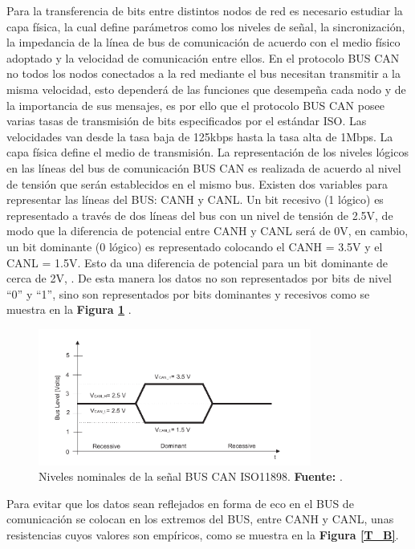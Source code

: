 Para la transferencia de bits entre distintos nodos de red es necesario estudiar la capa física, la cual define parámetros como los niveles de señal, la sincronización, la impedancia de la línea de bus de comunicación de acuerdo con el medio físico adoptado y la velocidad de comunicación entre ellos. En el protocolo BUS CAN no todos los nodos conectados a la red mediante el bus necesitan transmitir a la misma velocidad, esto dependerá de las funciones que desempeña cada nodo y de la importancia de sus mensajes, es por ello que el protocolo BUS CAN posee varias tasas de transmisión de bits especificados  por el estándar ISO. Las velocidades van desde la tasa baja de 125kbps hasta la tasa alta de 1Mbps.
La capa física define el medio de transmisión. La representación de los niveles lógicos en las líneas del bus de comunicación BUS CAN es realizada de acuerdo al nivel de tensión que serán establecidos en el mismo bus. Existen dos variables para representar las líneas del BUS: CANH y CANL. Un bit recesivo (1 lógico) es representado a través de dos líneas del bus con un nivel de tensión de 2.5V, de modo que la diferencia de potencial entre CANH  y CANL será de 0V, en cambio, un bit dominante (0 lógico) es representado colocando el CANH = 3.5V y el CANL = 1.5V. Esto da una diferencia de potencial para un bit dominante de cerca de 2V, \cite{PSMR}. De esta manera los datos no son representados por bits de nivel “0” y “1”, sino son representados por bits dominantes y recesivos como se muestra en la \textbf{Figura \ref{N_N}} . 


\begin{figure}[H]
	\centering
		\includegraphics[width=0.8\textwidth]{./Cap2imagen/niveles.pdf}
	\caption[Niveles nominales de la señal BUS CAN ISO 11898.]{Niveles nominales de la señal BUS CAN ISO11898.\textbf{ Fuente:} \cite{PSMR}.}
	\label{N_N} %
\end{figure}

Para evitar que los datos sean reflejados en forma de eco en el BUS de comunicación se colocan en los extremos del BUS, entre CANH y CANL, unas resistencias cuyos valores son empíricos, como se muestra en la \textbf{Figura \ref{T_B}}. 


